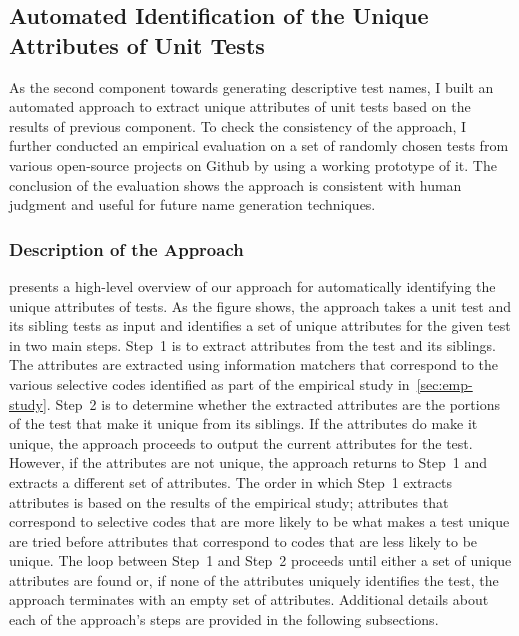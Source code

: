 \subsection{Automated Identification of the Unique Attributes of Unit Tests}
\label{sec:uniquness-approach}

As the second component towards generating descriptive test names, I built an automated approach to extract unique attributes of unit tests based on the results of previous component.
%
To check the consistency of the approach, I further conducted an empirical evaluation on a set of randomly chosen tests from various open-source projects on Github by using a working prototype of it.
%
The conclusion of the evaluation shows the approach is consistent with human judgment and useful for future name generation techniques.


\subsubsection{Description of the Approach}

 presents a high-level overview of our approach for automatically identifying the unique attributes of tests.
%
As the figure shows, the approach takes a unit test and its sibling tests as input and identifies a set of unique attributes for the given test in two main steps.
%
Step~1 is to extract attributes from the test and its siblings.
%
The attributes are extracted using information matchers that correspond to the various selective codes identified as part of the empirical study in~\cref{sec:emp-study}.
%
Step~2 is to determine whether the extracted attributes are the portions of the test that make it unique from its siblings.
%
If the attributes do make it unique, the approach proceeds to output the current attributes for the test.
%
However, if the attributes are not unique, the approach returns to Step~1 and extracts a different set of attributes.
%
The order in which Step~1 extracts attributes is based on the results of the empirical study; attributes that correspond to selective codes that are more likely to be what makes a test unique are tried before attributes that correspond to codes that are less likely to be unique.
% 
The loop between Step~1 and Step~2 proceeds until either a set of unique attributes are found or, if none of the attributes uniquely identifies the test, the approach terminates with an empty set of attributes.
%
Additional details about each of the approach's steps are provided in the following subsections.



